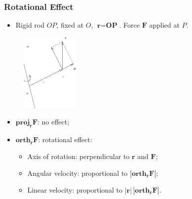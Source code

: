 \begin{frame}
 \frametitle{Rotational Effect}

 \begin{itemize}
  \item Rigid rod $OP$, fixed at $O$, $\textbf{r}=\textbf{OP}$. Force $\textbf{F}$ applied at $P$.
 \end{itemize}
%
\begin{figure}[h]
  \psfrag{}{$\alpha$}
  \includegraphics[height=1.5in]{../../modules/vectors/pictures/ok-torque.eps}
\end{figure}
%
\pause
\begin{itemize}
  \item $\textbf{proj}_{\bm{r}} \textbf{F}$: \pause no effect;
  \item $\textbf{orth}_{\bm{r}} \textbf{F}$: \pause rotational effect:\pause
  \begin{itemize}
    \item Axis of rotation: \pause perpendicular to $\textbf{r}$ and $\textbf{F}$;\pause
    \item Angular velocity: \pause proportional to $|\textbf{orth}_{\bm{r}} \textbf{F}|$;\pause
    \item Linear velocity: \pause proportional to $|\textbf{r}| \, |\textbf{orth}_{\bm{r}} \textbf{F}|$.
  \end{itemize}
\end{itemize}

\end{frame}